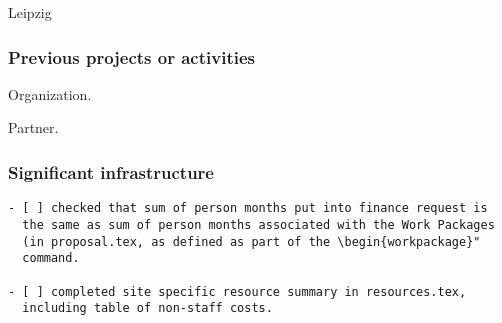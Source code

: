 \begin{sitedescription}{Leipzig}
\subsubsection*{Previous projects or activities}

\begin{compactenum}
\item Organization.
\item Partner.
\end{compactenum}

\subsubsection*{Significant infrastructure}


\end{sitedescription}

\begin{draft}
\vspace{1cm}

\begin{verbatim}
- [ ] checked that sum of person months put into finance request is
  the same as sum of person months associated with the Work Packages
  (in proposal.tex, as defined as part of the \begin{workpackage}"
  command.
  
- [ ] completed site specific resource summary in resources.tex,
  including table of non-staff costs.

\end{verbatim}
\end{draft}

